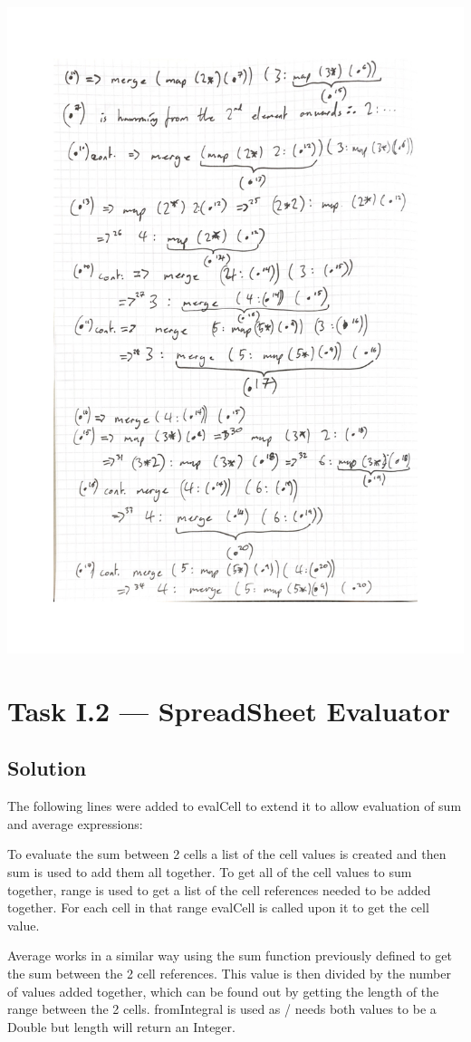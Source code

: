 \documentclass[a4paper]{article}
\begin{document}
\begin{center}
\begin{multicols}{2}
        \includegraphics[scale=0.45]{HammingCycle2.pdf}
    \end{multicols}
\end{center}


\section{Task I.2 --- SpreadSheet Evaluator}
\subsection{Solution}
The following lines were added to evalCell to extend it to allow evaluation of sum and average expressions:

\par
To evaluate the sum between 2 cells a list of the cell values is created and then sum is used to add them all together.
To get all of the cell values to sum together, range is used to get a list of the cell references needed to be added together.
For each cell in that range evalCell is called upon it to get the cell value.
\medskip
\par
Average works in a similar way using the sum function previously defined to get the sum between the 2 cell references.
This value is then divided by the number of values added together, which can be found out by getting the length of the range between the 2 cells.
fromIntegral is used as / needs both values to be a Double but length will return an Integer.
\end{document}
